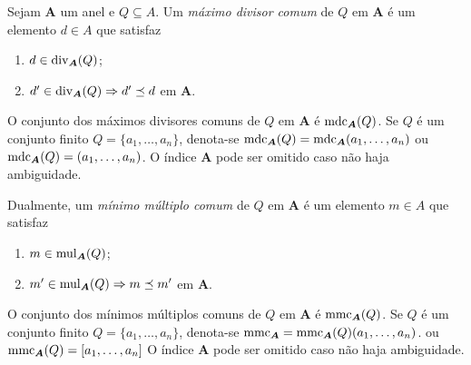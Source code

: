


\begin{defi}
	Sejam $\bm A$ um anel e $Q \subseteq A$. Um \emph{máximo divisor comum} de $Q$ em $\bm A$ é um elemento $d \in A$ que satisfaz
	\begin{enumerate}
	\item $d \in \operatorname{div}_{\bm A}(Q)$;
	\item $d' \in \operatorname{div}_{\bm A}(Q) \Rightarrow d' \preceq d$ em $\bm A$.
	\end{enumerate}
	O conjunto dos máximos divisores comuns de $Q$ em $\bm A$ é $\operatorname{mdc}_{\bm A}(Q)$. Se $Q$ é um conjunto finito $Q=\{a_1,\ldots,a_n\}$, denota-se $\operatorname{mdc}_{\bm A}(Q)=\operatorname{mdc}_{\bm A}(a_1,\ldots,a_n)$ ou $\operatorname{mdc}_{\bm A}(Q)=(a_1,\ldots,a_n)$. O índice $\bm A$ pode ser omitido caso não haja ambiguidade.

	Dualmente, um \emph{mínimo múltiplo comum} de $Q$ em $\bm A$ é um elemento $m \in A$ que satisfaz
	\begin{enumerate}
	\item $m \in \operatorname{mul}_{\bm A}(Q)$;
	\item $m' \in \operatorname{mul}_{\bm A}(Q) \Rightarrow m \preceq m'$ em $\bm A$.
	\end{enumerate}
	O conjunto dos mínimos múltiplos comuns de $Q$ em $\bm A$ é $\operatorname{mmc}_{\bm A}(Q)$. Se $Q$ é um conjunto finito $Q=\{a_1, \ldots, a_n\}$, denota-se $\operatorname{mmc}_{\bm A} = \operatorname{mmc}_{\bm A}(Q)(a_1, \ldots, a_n)$. ou $\operatorname{mmc}_{\bm A}(Q) = [a_1, \ldots, a_n]$ O índice $\bm A$ pode ser omitido caso não haja ambiguidade.
\end{defi}


